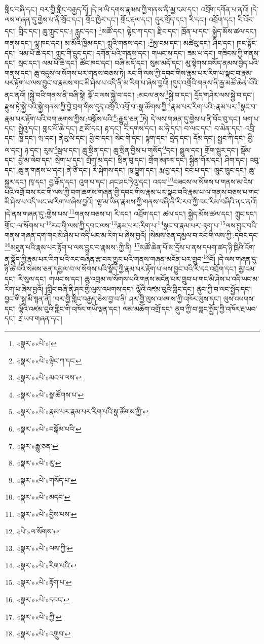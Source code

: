 གླིང་བཞི་དང་། བར་གྱི་གླིང་བརྒྱད་དོ། །དེ་ལ་ཡི་དགས་རྣམས་ཀྱི་གནས་ནི་མྱ་ངམ་དང་། འབྲོག་དགོན་པ་ནའོ། །དེ་ལས་གཞན་དུ་གྱེས་པ་ནི་གྲོང་དང་། གྲོང་ཁྱེར་དང་། གྲོང་རྡལ་དང་། དུར་གྲོད་དང་། རི་དང་། འབྲོག་དང་། རི་འོར་དང་། གླིང་དང་། ཆུ་ཀླུང་དང་:། རླུང་དང་། \footnote{«སྣར་»«པེ་»།  }མཚོ་དང་། ལྟེང་ཀ་དང་། རྫིང་དང་། ཁྲོན་པ་དང་། སྐྱེད་མོས་ཚལ་དང་། གནས་དང་། ལྷ་ཁང་དང་། མ་མོའི་ཁྱིམ་དང་། ཀླུའི་གནས་དང་། :\footnote{«སྣར་»«པེ་»ལྟེང་ཀ་དང་}མྱ་ངམ་དང་། མཚེའུ་དང་། ཤིང་དང་། ཁང་སྟོང་དང་། ལམ་པོ་ཆེ་དང་། ཀླུང་གི་དྲུང་དང་། དགོན་པའི་གནས་དང་། གཡང་ས་དང་། ཟམ་པ་དང་། གཟིངས་ཀྱི་གནས་དང་། སྲང་དང་། ལམ་པོ་ཆེ་དང་། ཚོང་ཁང་དང་། བཞི་མདོ་དང་། སུམ་མདོ་དང་། མུ་སྟེགས་བསོད་ནམས་བྱེད་པའི་གནས་དང་། ཆུ་འདུས་ལ་སོགས་པར་གནས་བཅས་ཏེ། རང་གི་ལས་ཀྱི་དབང་གིས་རྣམ་པར་རིག་པ་སྣང་བ་རྣམ་པར་རྟོག་པ་ལས་བྱུང་བ་རྣམས་གང་མི་ཤེས་པ་འདི་ནི་མ་རིག་པ་ཞེས་བྱའོ། །དུད་འགྲོའི་གནས་ནི་རྒྱ་མཚོ་ཆེན་པོའི་ནང་ནའོ། །སྐྱེ་བའི་གནས་ནི་བཞི་སྟེ། སྒོ་ང་ལས་སྐྱེ་བ་དང་། :མངལ་ནས་\footnote{«སྣར་»«པེ་»མངལ་ལས་}སྐྱེ་བ་དང་། དྲོད་གཤེར་ལས་སྐྱེ་བ་དང་། རྫུས་ཏེ་སྐྱེ་བའི་སྐྱེ་གནས་ཀྱི་བྱེ་བྲག་གིས་དུད་འགྲོའི་འགྲོ་བ་:སྣ་ཚོགས་ཀྱི་\footnote{«སྣར་»«པེ་»སྣ་ཚོགས་པ་}རྣམ་པར་རིག་པའི་:རྣམ་པར་\footnote{«སྣར་»«པེ་»རྣམ་པར་རྣམ་པར་རིག་པའི་སྣ་ཚོགས་ཀྱི་}སྣང་བ་རྣམ་པར་རྟོག་པའི་བག་ཆགས་ཀྱིས་:བསྒོས་པའི་\footnote{«སྣར་»«པེ་»བསྒོམ་པའི་}:རྒྱུད་ཅན་\footnote{«སྣར་»རྒྱུ་ཅན་}ཏེ། དེ་ལས་གཞན་དུ་གྱེས་པ་ནི་བོང་བུ་དང་། ཕག་པ་དང་། སྤྲེའུ་དང་། གླང་པོ་ཆེ་དང་། རྔ་མོ་དང་། རྟ་དང་། རི་དགས་དང་། མ་ཧེ་དང་། བ་ལང་དང་། བ་མེན་དང་། འབྲི་དང་། ཁྱི་དང་། ཝ་དང་། ནེའུ་ལེ་དང་། བྱི་བ་དང་། སེང་གེ་དང་། སྟག་དང་། དྲེད་དང་། དོམ་དང་། སྤྱང་ཀི་དང་། བྱི་ལ་དང་། ཉ་དང་། རུས་\footnote{«སྣར་»«པེ་»རུ་}སྦལ་དང་། ཆུ་སྲིན་དང་། ཆུ་སྲིན་བྱིས་པ་གསོད་\footnote{«སྣར་»«པེ་»གསོད་པ་}དང་། སྦྲུལ་དང་། གྲོག་སྦུར་དང་། སྡོམ་དང་། བྱེ་མ་ལེབ་དང་། སྲེག་པ་དང་། གྲོག་མ་དང་། སྲིན་བུ་དང་། གྲོག་མཁར་དང་། སྐྱིན་གོར་དང་། ཤིག་དང་། འབུ་དང་། ཆུ་ན་གནས་པ་དང་། ནེ་ཙོ་དང་། རི་སྐེགས་དང་། ཁུ་བྱུག་དང་། རྨ་བྱ་དང་། ངང་པ་དང་། ཁྲུང་ཁྲུང་དང་། ཆུ་སྐྱར་དང་། ཁྭ་དང་། བྱ་རྒོད་དང་། འུག་པ་དང་། ཤང་ཤང་ཏེའུ་དང་། འདབ་\footnote{«སྣར་»«པེ་»མདབ་}བཟངས་ལ་སོགས་པ་གནས་མ་ངེས་པའི་འགྲོ་བས་རང་གི་ལས་ཀྱི་བག་ཆགས་གཞན་གྱི་དབང་གིས་རྣམ་པར་སྣང་བའི་རྣམ་པ་ལ་གནས་བཅས་པ་གང་མི་ཤེས་པ་འདི་ཡང་མ་རིག་པ་ཞེས་བྱའོ། །ལྷ་མ་ཡིན་རྣམས་ཀྱི་གནས་བཞི་ནི་རི་རབ་ཀྱི་བང་རིམ་བཞིའི་ནང་ནའོ། །དེ་ནས་གཞན་དུ་:གྱེས་པས་\footnote{«སྣར་»«པེ་»བྱིས་པས་}གནས་བཅས་པ། རི་དང་། འབྲོག་དང་། ཚལ་དང་། སྐྱེད་མོས་ཚལ་དང་། ཀླུང་དང་། གྲོང་:ལ་སོགས་པ་\footnote{«པེ་»ལ་སོགས་}རང་གི་ལས་ཀྱི་དབང་ལས་\footnote{«སྣར་»«པེ་»ལས་ཀྱི་}རྣམ་པར་:རིག་པ་\footnote{«སྣར་»«པེ་»རིག་པའི་}སྣང་བ་རྣམ་པར་:རྟག་པ་\footnote{«སྣར་»«པེ་»རྟོག་པ་}ལས་བྱུང་བའི་གནས་གཞན་དག་གང་མི་ཤེས་པ་འདི་ཡང་མ་རིག་པ་ཞེས་བྱའོ། །སེམས་ཅན་དམྱལ་བ་རང་གི་ལས་ཀྱི་:དབང་དང་\footnote{«སྣར་»«པེ་»དབང་}མཐུན་པའི་རྣམ་པར་རྟོག་པ་ལས་བྱུང་བ་རྣམས་:ཀྱི་ནི། \footnote{«སྣར་»«པེ་»ཀྱི་}མཚོ་ཆེན་པོ་མ་དྲོས་པ་ནས་དཔག་ཚད་ཉི་ཁྲིའི་འོག་ན་སྣོད་ཀྱི་རྣམ་པར་རིག་པའི་རང་བཞིན་རྩ་བར་གྱུར་པའི་གནས་གཞན་མངོན་པར་གྲུབ་\footnote{«སྣར་»«པེ་»འགྲུབ་}བོ། །དེ་ལས་གཞན་དུ་ཉི་ཚེ་བའི་སེམས་ཅན་དམྱལ་བ་ལ་སོགས་པའི་སྣོད་ཀྱི་རྣམ་པར་རྟོག་པ་ལས་བྱུང་བའི་རི་དང་འབྲོག་དང་། མྱ་ངམ་དང་། རི་སུལ་དང་། གཡང་ས་དང་། ཆུ་འགྲམ་ལ་སོགས་པའི་གནས་མངོན་པར་གྲུབ་པ་གང་མི་ཤེས་པ་འདི་ཡང་མ་རིག་པ་ཞེས་བྱའོ། །གླིང་བཞི་ནི་ཤར་གྱི་ལུས་འཕགས་དང་། ལྷོའི་འཛམ་བུའི་གླིང་དང་། ནུབ་ཀྱི་བ་ལང་སྤྱོད་དང་། བྱང་གི་སྒྲ་མི་སྙན་ནོ། །བར་གྱི་གླིང་བརྒྱད་ཅེས་བྱ་བ་ནི། ཤར་གྱི་ལུས་འཕགས་ཀྱི་འཁོར་ལུས་དང་། ལུས་འཕགས་དང་། ལྷོའི་འཛམ་བུའི་གླིང་གི་འཁོར་གཡོ་ལྡན་དང་། ལམ་མཆོག་འགྲོ་དང་། ནུབ་ཀྱི་བ་གླང་སྤྱོད་ཀྱི་འཁོར་རྔ་ཡབ་དང་། རྔ་ཡབ་གཞན་དང་། 